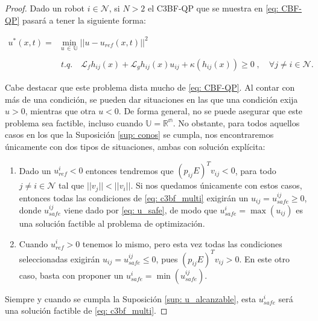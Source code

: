 \begin{proof}
    Dado un robot $i \in \mathcal{N}$, si $N>2$ el C3BF-QP que se muestra en \eqref{eq: CBF-QP} pasará a tener la siguiente forma:

    \begin{equation} \label{eq: c3bf_multi}
    \begin{array}{rl}
        u^*(x,t) = & \underset{u \, \in \, \mathds{U}}{\text{min}} \; ||u - u_{ref}(x,t)||^2 \\
        \\
               & t.q. \quad \mathcal{L}_f h_{ij}(x) + \mathcal{L}_g h_{ij}(x)u_{ij} + \kappa(h_{ij}(x)) \geq 0 \; , \quad \forall j \neq i \in \mathcal{N}.
    \end{array}
    \end{equation}
    
     Cabe destacar que este problema dista mucho de \eqref{eq: CBF-QP}. Al contar con más de una condición, se pueden dar situaciones en las que una condición exija $u>0$, mientras que otra $u<0$. De forma general, no se puede asegurar que este problema sea factible, incluso cuando $\mathds{U} = \mathds{R^m}$. No obstante, para todos aquellos casos en los que la Suposición \eqref{sup: conos} se cumpla, nos encontraremos únicamente con dos tipos de situaciones, ambas con solución explícita:
    
    \begin{enumerate}
        \item Dado un $u_{ref}^i < 0$ entonces tendremos que $(p_{ij} E)^T v_{ij} < 0$, para todo $j \neq i \in \mathcal{N}$ tal que $||v_j|| < ||v_i||$. Si nos quedamos únicamente con estos casos, entonces todas las condiciones de \eqref{eq: c3bf_multi} exigirán un $u_{ij} = u_{safe}^{ij} \geq 0$, donde $u_{safe}^{ij}$ viene dado por \eqref{eq: u_safe}, de modo que $u_{safe}^{i} = \max(u_{ij})$ es una solución factible al problema de optimización.\\

        \item Cuando $u_{ref}^i > 0$ tenemos lo mismo, pero esta vez todas las condiciones seleccionadas exigirán $u_{ij} = u_{safe}^{ij} \leq 0$, pues $(p_{ij} E)^T v_{ij} > 0$. En este otro caso, basta con proponer un $u_{safe}^{i} = \min(u_{safe}^{ij})$.
    \end{enumerate}

    Siempre y cuando se cumpla la Suposición \ref{sup: u_alcanzable}, esta $u_{safe}^{i}$ será una solución factible de \eqref{eq: c3bf_multi}.
    

\end{proof}
